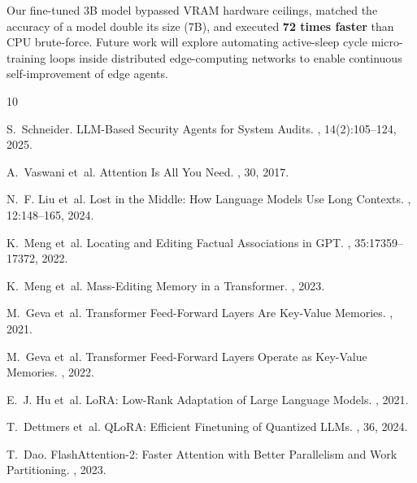 \documentclass[10pt,twocolumn]{article}
\begin{document}
Our fine-tuned 3B model bypassed VRAM hardware ceilings, matched the accuracy of a model double its size (7B), and executed \textbf{72 times faster} than CPU brute-force. Future work will explore automating active-sleep cycle micro-training loops inside distributed edge-computing networks to enable continuous self-improvement of edge agents.

\begin{thebibliography}{10}

S.~Schneider.
\newblock LLM-Based Security Agents for System Audits.
, 14(2):105--124, 2025.

A.~Vaswani et~al.
\newblock Attention Is All You Need.
, 30, 2017.

N.~F. Liu et~al.
\newblock Lost in the Middle: How Language Models Use Long Contexts.
, 12:148--165, 2024.

K.~Meng et~al.
\newblock Locating and Editing Factual Associations in GPT.
, 35:17359--17372, 2022.

K.~Meng et~al.
\newblock Mass-Editing Memory in a Transformer.
, 2023.

M.~Geva et~al.
\newblock Transformer Feed-Forward Layers Are Key-Value Memories.
, 2021.

M.~Geva et~al.
\newblock Transformer Feed-Forward Layers Operate as Key-Value Memories.
, 2022.

E.~J. Hu et~al.
\newblock LoRA: Low-Rank Adaptation of Large Language Models.
, 2021.

T.~Dettmers et~al.
\newblock QLoRA: Efficient Finetuning of Quantized LLMs.
, 36, 2024.

T.~Dao.
\newblock FlashAttention-2: Faster Attention with Better Parallelism and Work Partitioning.
, 2023.


\end{thebibliography}
\end{document}
